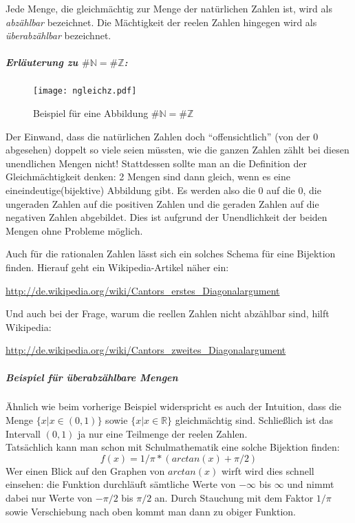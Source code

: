 Jede Menge, die gleichmächtig zur Menge der natürlichen Zahlen ist, wird als \emph{abzählbar} bezeichnet.
Die Mächtigkeit der reelen Zahlen hingegen wird als \emph{überabzählbar} bezeichnet.
\subparagraph{Erläuterung zu \(\#{\mathbb N} = \#{\mathbb Z}\):}
\begin{figure}[b]
  \centering
  \caption{Beispiel für eine Abbildung \(\#{\mathbb N} = \#{\mathbb Z}\)}
  \texttt{[image: ngleichz.pdf]}
\end{figure}
Der Einwand, dass die natürlichen Zahlen doch ``offensichtlich'' (von der 0
abgesehen) doppelt so viele seien müssten, wie die ganzen Zahlen zählt
bei diesen unendlichen Mengen nicht! Stattdessen sollte man an die
Definition der Gleichmächtigkeit denken: 2 Mengen sind dann gleich,
wenn es eine eineindeutige(bijektive) Abbildung gibt.
Es werden also die 0 auf die 0, die ungeraden Zahlen auf die positiven
Zahlen und die geraden Zahlen auf die negativen Zahlen abgebildet.
Dies ist aufgrund der Unendlichkeit der beiden Mengen ohne Probleme
möglich.

Auch für die rationalen Zahlen lässt sich ein solches Schema für eine Bijektion finden.
Hierauf geht ein Wikipedia-Artikel näher ein:

\url{http://de.wikipedia.org/wiki/Cantors_erstes_Diagonalargument}

Und auch bei der Frage, warum die reellen Zahlen nicht abzählbar sind, hilft Wikipedia:

\url{http://de.wikipedia.org/wiki/Cantors_zweites_Diagonalargument}

\subparagraph{Beispiel für überabzählbare Mengen}
Ähnlich wie beim vorherige Beispiel widerspricht es auch der Intuition, dass die Menge $\{ x | x \in (0,1) \}$ sowie $\{x | x \in {\mathbb R} \}$ gleichmächtig sind.
Schließlich ist das Intervall $(0,1)$ ja nur eine Teilmenge der reelen Zahlen.
\\Tatsächlich kann man schon mit Schulmathematik eine solche Bijektion finden: $$ f(x) = {1}/{\pi} * (arctan(x) + \pi/2 ) $$
Wer einen Blick auf den Graphen von $arctan(x)$ wirft wird dies schnell einsehen: 
die Funktion durchläuft sämtliche Werte von $-\infty$ bis $\infty$ und nimmt dabei nur Werte von $-\pi/2$ bis $\pi/2$ an. 
Durch Stauchung mit dem Faktor ${1}/{\pi}$ sowie Verschiebung nach oben kommt man dann zu obiger Funktion.

